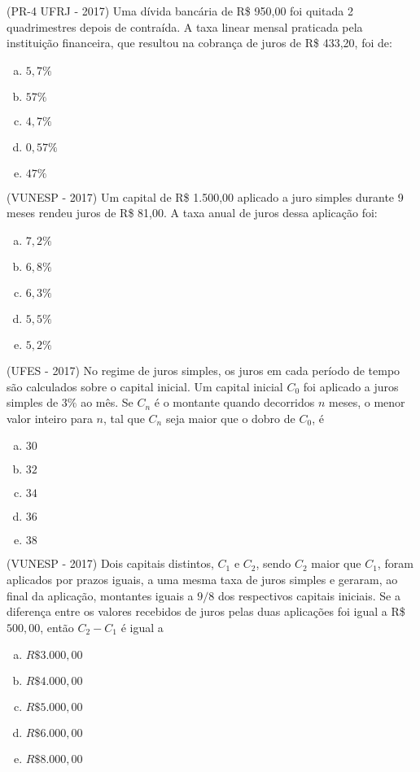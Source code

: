  \begin{exer}
  (PR-4 UFRJ - 2017) Uma dívida bancária de R\$ 950,00 foi quitada 2 quadrimestres depois de contraída. A taxa linear mensal praticada pela instituição financeira, que resultou na cobrança de juros de R\$ 433,20, foi de:
   \begin{enumerate}[a)]
  \item $5,7\%$
  \item $57\%$
  \item $4,7\%$
  \item $0,57\%$
  \item $47\%$
  \end{enumerate}
  \end{exer}

  \begin{exer}
  (VUNESP - 2017) Um capital de R\$ 1.500,00 aplicado a juro simples durante 9 meses rendeu juros de R\$ 81,00. A taxa anual de juros dessa aplicação foi:
  \begin{enumerate}[a)]
  \item $7,2\%$
  \item $6,8\%$
  \item $6,3\%$
  \item $5,5\%$
  \item $5,2\%$
  \end{enumerate}
  \end{exer}

  \begin{exer}
  (UFES - 2017) No regime de juros simples, os juros em cada período de tempo são calculados sobre o capital inicial. Um capital inicial $C_0$ foi aplicado a juros simples de $3\%$ ao mês. Se $C_n$ é o montante quando decorridos $n$ meses, o menor valor inteiro para $n$, tal que $C_n$ seja maior que o dobro de $C_0$, é
  \begin{enumerate}[a)]
  \item $30$
  \item $32$
  \item $34$
  \item $36$
  \item $38$
  \end{enumerate}
  \end{exer}

  \begin{exer}
  (VUNESP - 2017) Dois capitais distintos, $C_1$ e $C_2$, sendo $C_2$ maior que $C_1$, foram aplicados por prazos iguais, a uma mesma taxa de juros simples e geraram, ao final da aplicação, montantes iguais a $9/8$ dos respectivos capitais iniciais. Se a diferença entre os valores recebidos de juros pelas duas aplicações foi igual a R\$ $500,00$, então $C_2 - C_1$ é igual a
  \begin{enumerate}[a)]
  \item $R\$ 3.000,00$
  \item $R\$ 4.000,00$
  \item $R\$ 5.000,00$
  \item $R\$ 6.000,00$
  \item $R\$ 8.000,00$
  \end{enumerate}
  \end{exer}

